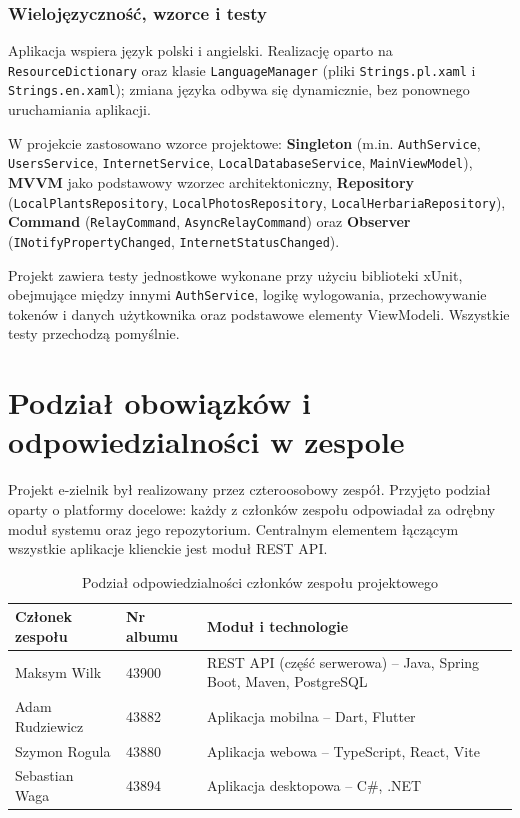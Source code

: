 \documentclass[12pt,a4paper]{article}
\begin{document}
\subsubsection{Wieloj\k{e}zyczno\'s\'c, wzorce i testy}

Aplikacja wspiera j\k{e}zyk polski i angielski. Realizacj\k{e} oparto na \texttt{ResourceDictionary} oraz klasie \texttt{LanguageManager} (pliki \texttt{Strings.pl.xaml} i \texttt{Strings.en.xaml}); zmiana j\k{e}zyka odbywa si\k{e} dynamicznie, bez ponownego uruchamiania aplikacji.

W projekcie zastosowano wzorce projektowe: \textbf{Singleton} (m.in. \texttt{AuthService}, \texttt{UsersService}, \texttt{InternetService}, \texttt{LocalDatabaseService}, \texttt{MainViewModel}), \textbf{MVVM} jako podstawowy wzorzec architektoniczny, \textbf{Repository} (\texttt{LocalPlantsRepository}, \texttt{LocalPhotosRepository}, \texttt{LocalHerbariaRepository}), \textbf{Command} (\texttt{RelayCommand}, \texttt{AsyncRelayCommand}) oraz \textbf{Observer} (\texttt{INotifyPropertyChanged}, \texttt{InternetStatusChanged}).

Projekt zawiera testy jednostkowe wykonane przy u\.zyciu biblioteki xUnit, obejmuj\k{a}ce mi\k{e}dzy innymi \texttt{AuthService}, logik\k{e} wylogowania, przechowywanie token\'ow i danych u\.zytkownika oraz podstawowe elementy ViewModeli. Wszystkie testy przechodz\k{a} pomy\'slnie.

\section{Podzia\l{} obowi\k{a}zk\'ow i odpowiedzialno\'sci w zespole}

Projekt e-zielnik by\l{} realizowany przez czteroosobowy zesp\'o\l{}. Przyj\k{e}to podzia\l{} oparty o platformy docelowe: ka\.zdy z cz\l{}onk\'ow zespo\l{}u odpowiada\l{} za odr\k{e}bny modu\l{} systemu oraz jego repozytorium. Centralnym elementem \l{}\k{a}cz\k{a}cym wszystkie aplikacje klienckie jest modu\l{} REST API.

\begin{table}[htbp]
\centering
\caption{Podzia\l{} odpowiedzialno\'sci cz\l{}onk\'ow zespo\l{}u projektowego}
\label{tab:zespol}
\vspace{0.3em}
\begin{tabularx}{\textwidth}{@{}p{3.4cm}p{1.6cm}X@{}}
\toprule
\textbf{Cz\l{}onek zespo\l{}u} & \textbf{Nr albumu} & \textbf{Modu\l{} i technologie} \\
\midrule
Maksym Wilk & 43900 & REST API (cz\k{e}\'s\'c serwerowa) -- Java, Spring Boot, Maven, PostgreSQL \\ \addlinespace
Adam Rudziewicz & 43882 & Aplikacja mobilna -- Dart, Flutter \\ \addlinespace
Szymon Rogula & 43880 & Aplikacja webowa -- TypeScript, React, Vite \\ \addlinespace
Sebastian Waga & 43894 & Aplikacja desktopowa -- C\#, .NET \\
\bottomrule
\end{tabularx}
\end{table}
\end{document}
